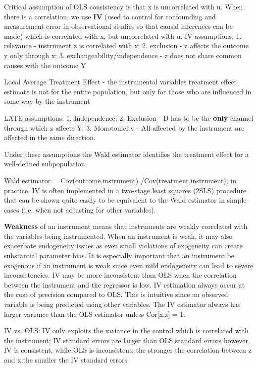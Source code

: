 \documentclass[7pt, a4paper]{article}
\begin{document}
\begin{multicols*}{3}
Critical assumption of OLS consistency is that x is uncorrelated with u. When there is a correlation, we use \textbf{IV} (used to control for confounding and measurement error in observational studies so that causal inferences can be made) which is correlated with x, but uncorrelated with u.
IV assumptions: 1. relevance - instrument z is correlated with x; 2. exclusion - z affects the outcome y only through x; 3. exchangeability/independence - z does not share common causes with the outcome Y

Local Average Treatment Effect - the instrumental variables treatment effect estimate is not for the entire population, but only for those who are influenced in some way by the instrument

LATE assumptions: 1. Independence; 2. Exclusion - D has to be the \textbf{only} channel through which z affects Y; 3. Monotonicity - All affected by the instrument are affected in the same direction. 

Under these assumptions the Wald estimator identifies the treatment effect for a well-defined subpopulation.

Wald estimator = Cov(outcome,instrument) /Cov(treatment,instrument); in practice, IV is often implemented in a two-stage least squares (2SLS) procedure that can be shown quite easily to be equivalent to the Wald estimator in simple cases (i.e. when not adjusting for other variables).

\textbf{Weakness} of an instrument means that instruments are weakly correlated with
the variables being instrumented. When an instrument is weak, it may also exacerbate endogeneity issues as even
small violations of exogeneity can create substantial parameter bias. It is especially important that an instrument be exogenous if an instrument is
weak since even mild endogeneity can lead to severe inconsistencies. IV may be more inconsistent than OLS when the correlation between the
instrument and the regressor is low. IV estimation always occur at the cost of precision compared to OLS. This is
intuitive since an observed variable is being predicted using other variables. The IV estimator always has larger variance than the OLS estimator unless
Cor[x,z] = 1.

IV vs. OLS: IV only exploits the variance in the control which is correlated with the instrument; IV standard errors are larger than OLS standard errors however, IV is consistent, while OLS is inconsistent; the stronger the correlation between z and x,the smaller the IV standard errors


\end{multicols*}
\end{document}
